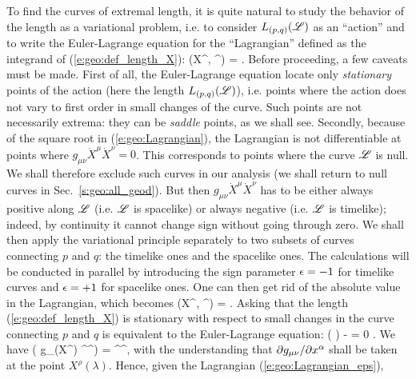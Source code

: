 To find the curves of extremal length, it is
quite natural to study the behavior of the length as a
variational problem, i.e. to consider $L_{(p,q)}(\mathscr{L})$ as an ``action''
and to write the Euler-Lagrange equation
for the ``Lagrangian'' defined as the integrand of (\ref{e:geo:def_length_X}):
\be \label{e:geo:Lagrangian}
    (X^\alpha, ^\alpha) =  .
\ee
Before proceeding, a few
caveats must be made. First of all, the Euler-Lagrange equation
locate only \emph{stationary} points of the action (here the length
$L_{(p,q)}(\mathscr{L})$), i.e. points where the action does not vary
to first order in small changes of the curve. Such points are not
necessarily extrema: they can be \emph{saddle} points, as we shall see.
Secondly, because of the square root in (\ref{e:geo:Lagrangian}),
the Lagrangian is not differentiable at points where
$g_{\mu\nu} \dot{X}^\mu \dot{X}^\nu = 0$.
This corresponds to points where the curve $\mathscr{L}$ is null. We shall
therefore exclude such curves in our analysis (we shall return to null
curves in Sec.~\ref{s:geo:all_geod}). But then $g_{\mu\nu} \dot{X}^\mu \dot{X}^\nu$
has to be either always positive along $\mathscr{L}$ (i.e. $\mathscr{L}$
is spacelike) or always negative (i.e. $\mathscr{L}$ is timelike); indeed,
by continuity it cannot change sign without going through zero.
We shall then apply the variational principle separately
to two subsets of curves connecting $p$ and $q$: the timelike ones and the
spacelike ones. The calculations will be conducted in parallel by introducing
the sign parameter $\epsilon=-1$ for timelike curves and $\epsilon=+1$ for spacelike
ones. One can then get rid of the absolute value in the Lagrangian, which
becomes
\be \label{e:geo:Lagrangian_eps}
    (X^\alpha, ^\alpha) =  .
\ee
Asking that the length (\ref{e:geo:def_length_X}) is stationary
with respect to small changes in the curve connecting $p$ and $q$
is equivalent to the Euler-Lagrange equation:
\be \label{e:geo:Euler-Lagrange}
    \frac{\D}{\D\lambda}\left( \right)
        -  = 0 .
\ee
We have
\be \label{e:geo:der_gXX_X}
     \left( g_{\mu\nu}(X^\rho) ^\mu {}^\nu \right)
        =   ^\mu {}^\nu  ,
\ee
with the understanding that ${\partial g_{\mu\nu}}/{\partial x^\alpha}$ shall be
taken at the point $X^\rho(\lambda)$. Hence, given the Lagrangian (\ref{e:geo:Lagrangian_eps}),
\be \label{e:geo:derL_X}
